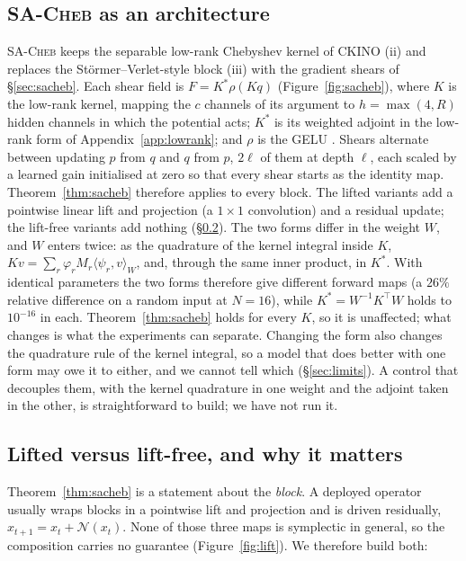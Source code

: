 \documentclass[11pt]{article}
\theoremstyle{definition}
\theoremstyle{remark}
\newcommand{\iprod}[2]{\langle #1, #2 \rangle}
\newcommand{\sacheb}{\textsc{SA-Cheb}}
\newcommand{\ckino}{\textsc{CKINO}}
\begin{document}
\subsection{\sacheb{} as an architecture}
\label{sec:sacheb-arch}

\sacheb{} keeps the separable low-rank Chebyshev kernel of \ckino{} (ii) and
replaces the St\"ormer--Verlet-style block (iii) with the gradient shears of
\S\ref{sec:sacheb}. Each shear field is $F=K^{*}\rho(Kq)$
(Figure~\ref{fig:sacheb}), where $K$ is the low-rank kernel, mapping the $c$
channels of its argument to $h=\max(4,R)$ hidden channels in which the potential
acts; $K^{*}$ is its weighted adjoint in the low-rank form of
Appendix~\ref{app:lowrank}; and $\rho$ is the GELU \citep{hendrycks2016gelu}. Shears alternate between
updating $p$ from $q$ and $q$ from $p$, $2\ell$ of them at depth $\ell$, each
scaled by a learned gain initialised at zero so that every shear starts as the
identity map.
Theorem~\ref{thm:sacheb} therefore applies to every block. The lifted variants
add a pointwise linear lift and projection (a $1\times1$ convolution) and a
residual update; the lift-free variants add nothing (\S\ref{sec:lift}). The two
forms differ in the weight $W$, and $W$ enters twice: as the quadrature of the
kernel integral inside $K$, $Kv=\sum_r\varphi_rM_r\iprod{\psi_r}{v}_W$, and,
through the same inner product, in $K^{*}$. With identical parameters the two
forms therefore give different forward maps (a $26\%$ relative difference on a
random input at $N=16$), while $K^{*}=W^{-1}K^{\top}W$ holds to $10^{-16}$ in
each. Theorem~\ref{thm:sacheb} holds for every $K$, so it is unaffected; what
changes is what the experiments can separate. Changing the form also changes the
quadrature rule of the kernel integral, so a model that does better with one
form may owe it to either, and we cannot tell which (\S\ref{sec:limits}). A
control that decouples them, with the kernel quadrature in one weight and the
adjoint taken in the other, is straightforward to build; we have not run it.

\subsection{Lifted versus lift-free, and why it matters}
\label{sec:lift}

Theorem~\ref{thm:sacheb} is a statement about the \emph{block}. A deployed
operator usually wraps blocks in a pointwise lift and projection and is driven
residually, $x_{t+1}=x_t+\mathcal{N}(x_t)$. None of those three maps is
symplectic in general, so the composition carries no guarantee
(Figure~\ref{fig:lift}). We therefore build both:
\end{document}
